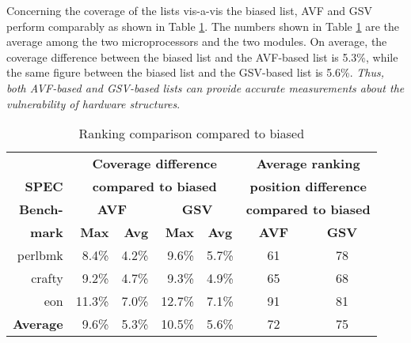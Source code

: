 \documentclass[12pt]{yalephd}
\begin{document}
Concerning the coverage of the lists vis-a-vis the biased list, AVF and GSV perform comparably as shown in Table \ref{sC4tCROC_accuracy}. The numbers shown in Table \ref{sC4tCROC_accuracy} are the average among the two microprocessors and the two modules. On average, the coverage difference between the biased list and the AVF-based list is 5.3\%, while the same figure between the biased list and the GSV-based list is 5.6\%. {\em Thus, both AVF-based and GSV-based lists can provide accurate measurements about the vulnerability of hardware structures}.

\begin{table}[!ht]
\begin{center}
\caption{Ranking comparison compared to biased}\label{sC4tCROC_accuracy}
\begin{tabular}{||r|r|r|r|c|c|c||}
\hline
\hline
{}              &\multicolumn{4}{|c|}{\bf{Coverage difference}} & \multicolumn{2}{|c||}{\bf{Average ranking}}    \\
{\bf SPEC}      &\multicolumn{4}{|c|}{\bf{compared to biased}}  & \multicolumn{2}{|c||}{\bf{position difference}}\\
{\bf Bench-}    &\multicolumn{2}{|c|}{\bf{AVF}} &\multicolumn{2}{|c|}{\bf{GSV}}&\multicolumn{2}{|c||}{\bf{compared to biased}}\\
{\bf mark}      &{\bf Max}&{\bf Avg}            &{\bf Max}&{\bf Avg}            &{\bf AVF  } & {\bf GSV}                       \\
\hline
perlbmk	      &  8.4\% &  4.2\% &  9.6\% &  5.7\% & 61 & 78 \\
crafty	      &  9.2\% &  4.7\% &  9.3\% &  4.9\% & 65 & 68 \\
eon	          & 11.3\% &  7.0\% & 12.7\% &  7.1\% & 91 & 81 \\
\hline
{\bf Average} &  9.6\% &  5.3\% &  10.5\% &  5.6\% & 72 & 75 \\
\hline
\hline
\end{tabular}
\end{center}
\end{table}
\end{document}
